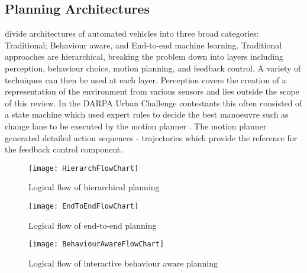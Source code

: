 \subsection{Planning Architectures}

\cite{Schwarting2018} divide architectures of automated vehicles into three broad categories: Traditional; Behaviour aware, and End-to-end machine learning. Traditional approaches are hierarchical, breaking the problem down into layers including perception, behaviour choice, motion planning, and feedback control. A variety of techniques can then be used at each layer. Perception covers the creation of a representation of the environment from various sensors and lies outside the scope of this review. In the DARPA Urban Challenge contestants this often consisted of a state machine which used expert rules to decide the best manoeuvre such as change lane to be executed by the motion planner \cite{Urmson2008}. The motion planner generated detailed action sequences - trajectories which provide the reference for the feedback control component. 



\begin{figure}[ht]
  \begin{center}
	\texttt{[image: HierarchFlowChart]}
	\caption{Logical flow of hierarchical planning}
	\label{fig:hierarch_flow}
  \end{center}
\end{figure}
\begin{figure}[ht]
  \begin{center}
	\texttt{[image: EndToEndFlowChart]}
	\caption{Logical flow of end-to-end planning}
	\label{fig:endtoend_flow}
  \end{center}
\end{figure}
\begin{figure}[ht]
  \begin{center}
	\texttt{[image: BehaviourAwareFlowChart]}
	\caption{Logical flow of interactive behaviour aware planning}
	\label{fig:behaviour_aware_flow}
  \end{center}
\end{figure}

